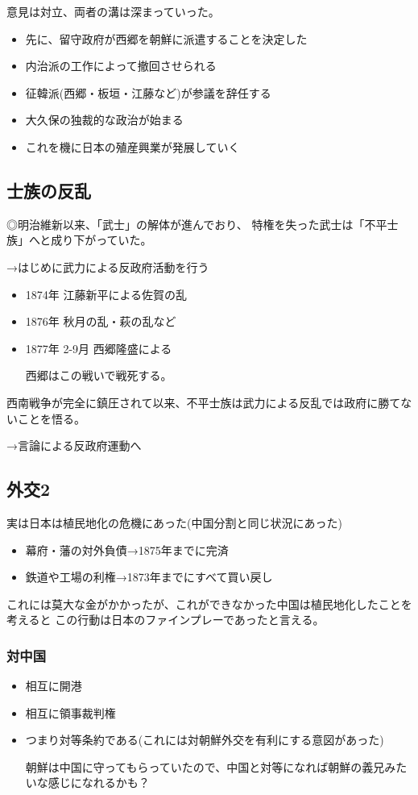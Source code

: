 \documentclass[12pt]{ltjsarticle}
\begin{document}
意見は対立、両者の溝は深まっていった。

\begin{itemize}
\item 先に、留守政府が西郷を朝鮮に派遣することを決定した
\item 内治派の工作によって撤回させられる
\item 征韓派(西郷・板垣・江藤など)が参議を辞任する
\end{itemize}

\begin{itemize}
\item 大久保の独裁的な政治が始まる
\item これを機に日本の殖産興業が発展していく
\end{itemize}

\subsection{士族の反乱}
◎明治維新以来、「武士」の解体が進んでおり、
特権を失った武士は「不平士族」へと成り下がっていた。

→はじめに武力による反政府活動を行う
\begin{itemize}
\item 1874年 江藤新平による佐賀の乱
\item 1876年 秋月の乱・萩の乱など
\item 1877年 2-9月 西郷隆盛による

西郷はこの戦いで戦死する。
\end{itemize}

西南戦争が完全に鎮圧されて以来、不平士族は武力による反乱では政府に勝てないことを悟る。

→言論による反政府運動へ

\subsection{外交2}
実は日本は植民地化の危機にあった(中国分割と同じ状況にあった)

\begin{itemize}
\item 幕府・藩の対外負債→1875年までに完済
\item 鉄道や工場の利権→1873年までにすべて買い戻し
\end{itemize}
これには莫大な金がかかったが、これができなかった中国は植民地化したことを考えると
この行動は日本のファインプレーであったと言える。

\subsubsection{対中国}
\begin{itemize}
\item 相互に開港
\item 相互に領事裁判権
\item つまり対等条約である(これには対朝鮮外交を有利にする意図があった)

朝鮮は中国に守ってもらっていたので、中国と対等になれば朝鮮の義兄みたいな感じになれるかも？
\end{itemize}
\end{document}
